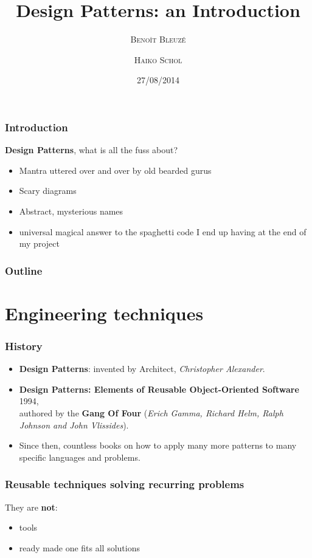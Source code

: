 \documentclass{beamer}
\title
{Design Patterns: an Introduction}
\author[B. Bleuz\'e \and H. Schol] %
{\textsc{Beno\^it Bleuz\'e} \and \textsc{Haiko Schol}}
\date[2014] %
{27/08/2014}
\begin{document}
\begin{frame}
  \titlepage
\end{frame}

\begin{frame}
\frametitle {Introduction}
  \textbf{Design Patterns}, what is all the fuss about?
\begin{itemize}
 \item Mantra uttered over and over by old bearded gurus
 \item Scary diagrams
 \item Abstract, mysterious names
 \item universal magical answer to the spaghetti code I end up having at the end of my project
\end{itemize}
\centering {}
\end{frame}

\begin{frame}
  \frametitle{Outline}
  \tableofcontents
\end{frame}

\section{Engineering techniques}
\begin{frame}
\frametitle {History}
\begin{itemize}
 \item \textbf{Design Patterns}: invented by  Architect, \emph{Christopher Alexander}.\pause
 \item \pause \textbf{Design Patterns: Elements of Reusable Object-Oriented Software} 1994, \\
authored by the \textbf{Gang Of Four} (\emph{Erich Gamma, Richard Helm, Ralph Johnson and John Vlissides}).
 \item \pause Since then, countless books on how to apply many more patterns to many specific languages and problems.
\end{itemize}




\end{frame}
\begin{frame}
 \frametitle{Reusable techniques solving recurring problems}
They are \textbf{not}:
  \begin{itemize}
   \item tools
   \item ready made one fits all solutions
  \end{itemize}

\end{frame}
\end{document}
